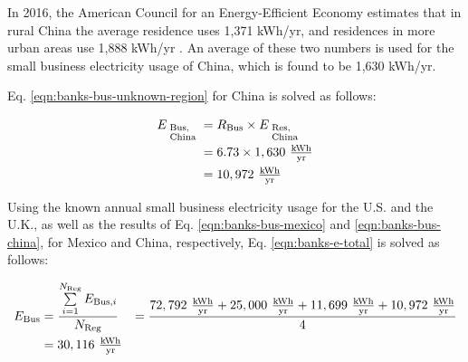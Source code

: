 In 2016, the American Council for an Energy-Efficient Economy estimates that in rural China the average residence uses 1,371 kWh/yr, and residences in more urban areas use 1,888 kWh/yr \cite{residential-china}.
An average of these two numbers is used for the small business electricity usage of China, which is found to be 1,630 kWh/yr.

Eq. \eqref{eqn:banks-bus-unknown-region} for China is solved as follows:

\begin{align}\label{eqn:banks-bus-china}
  E_{\begin{subarray}{l} \textrm{ {Bus,} } \\ \textrm{ {China} } \end{subarray} } &= R_\textrm{Bus} \times E_{\begin{subarray}{l} \textrm{ {Res,} } \\ \textrm{ {China} } \end{subarray} } \\
                            &= 6.73 \times 1,630 \ \tfrac{ \textrm{kWh} } { \textrm{yr} } \nonumber \\
                            &= 10,972 \ \tfrac{ \textrm{kWh} } { \textrm{yr} } \nonumber
\end{align}


Using the known annual small business electricity usage for the U.S. and the U.K., as well as the results of Eq. \eqref{eqn:banks-bus-mexico} and \eqref{eqn:banks-bus-china}, for Mexico and China, respectively, Eq. \eqref{eqn:banks-e-total} is solved as follows:

\begin{align}\label{eqn:banks-e-total-res}
  E_\textrm{Bus} &= \dfrac{ \sum \limits_{i=1} ^ {N_\textrm{Reg} } E_{\textrm{Bus,}i } }{ N_\textrm{Reg} }
                 &= \frac{ 72,792 \ \tfrac{ \textrm{kWh} } { \textrm{yr} } + 25,000 \ \tfrac{ \textrm{kWh} } { \textrm{yr} } + 11,699 \ \tfrac{ \textrm{kWh} } { \textrm{yr} } + 10,972 \ \tfrac{ \textrm{kWh} } { \textrm{yr} } } { 4 } \\
                 &= 30,116 \ \tfrac{ \textrm{kWh} } { \textrm{yr} } \nonumber
\end{align}
